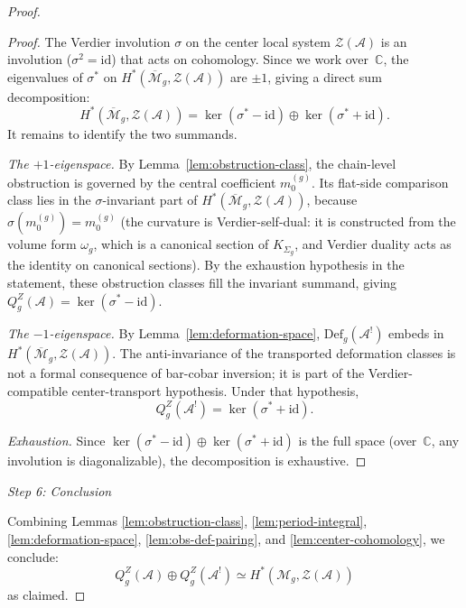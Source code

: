 \begin{proof}
\begin{proof}
The Verdier involution $\sigma$ on the center local system
$\mathcal{Z}(\mathcal{A})$ is an involution ($\sigma^2 = \mathrm{id}$)
that acts on cohomology. Since we work over~$\mathbb{C}$, the
eigenvalues of $\sigma^*$ on
$H^*(\overline{\mathcal{M}}_g, \mathcal{Z}(\mathcal{A}))$ are $\pm 1$,
giving a direct sum decomposition:
\[
H^*(\overline{\mathcal{M}}_g, \mathcal{Z}(\mathcal{A}))
= \ker(\sigma^* - \mathrm{id})
\oplus \ker(\sigma^* + \mathrm{id}).
\]
It remains to identify the two summands.

\emph{The $+1$-eigenspace.}
By Lemma~\ref{lem:obstruction-class}, the chain-level obstruction is
governed by the central coefficient $m_0^{(g)}$. Its flat-side
comparison class lies in the $\sigma$-invariant part of
$H^*(\overline{\mathcal{M}}_g, \mathcal{Z}(\mathcal{A}))$, because
$\sigma(m_0^{(g)}) = m_0^{(g)}$ (the curvature is Verdier-self-dual:
it is constructed from the volume form $\omega_g$, which is a canonical
section of $K_{\Sigma_g}$, and Verdier duality acts as the identity on
canonical sections). By the exhaustion hypothesis in the statement,
these obstruction classes fill the invariant summand, giving
$Q_g^Z(\mathcal{A}) = \ker(\sigma^* - \mathrm{id})$.

\emph{The $-1$-eigenspace.}
By Lemma~\ref{lem:deformation-space},
$\mathrm{Def}_g(\mathcal{A}^!)$ embeds in
$H^*(\overline{\mathcal{M}}_g, \mathcal{Z}(\mathcal{A}))$.
The anti-invariance of the transported deformation classes is not a
formal consequence of bar-cobar inversion; it is part of the
Verdier-compatible center-transport hypothesis. Under that hypothesis,
\[
Q_g^Z(\mathcal{A}^!) = \ker(\sigma^* + \mathrm{id}).
\]

\emph{Exhaustion.}
Since $\ker(\sigma^* - \mathrm{id}) \oplus \ker(\sigma^* + \mathrm{id})$
is the full space (over~$\mathbb{C}$, any involution is diagonalizable),
the decomposition is exhaustive.
\end{proof}

\emph{Step 6: Conclusion}

Combining Lemmas \ref{lem:obstruction-class}, \ref{lem:period-integral},
\ref{lem:deformation-space}, \ref{lem:obs-def-pairing}, and \ref{lem:center-cohomology},
we conclude:
\[
Q_g^Z(\mathcal{A}) \oplus Q_g^Z(\mathcal{A}^!)
\simeq
H^*(\mathcal{M}_g, \mathcal Z(\mathcal{A}))
\]
as claimed.

\end{proof}

